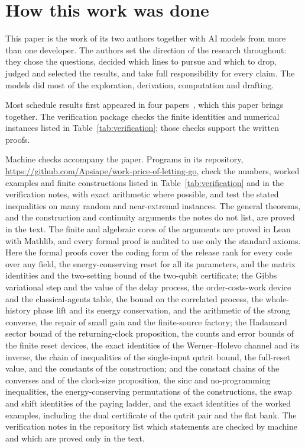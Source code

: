 \section*{How this work was done}
This paper is the work of its two authors together with AI models from more than one developer. The authors set the direction of the research throughout: they chose the questions, decided which lines to pursue and which to drop, judged and selected the results, and take full responsibility for every claim. The models did most of the exploration, derivation, computation and drafting.

Most schedule results first appeared in four papers~\cite{Order,SaveWork,Answering,KeepingTime}, which this paper brings together. The verification package checks the finite identities and numerical instances listed in Table~\ref{tab:verification}; those checks support the written proofs.

Machine checks accompany the paper. Programs in its repository, \url{https://github.com/Apsiape/work-price-of-letting-go}, check the numbers, worked examples and finite constructions listed in Table~\ref{tab:verification} and in the verification notes, with exact arithmetic where possible, and test the stated inequalities on many random and near-extremal instances. The general theorems, and the construction and continuity arguments the notes do not list, are proved in the text. The finite and algebraic cores of the arguments are proved in Lean with Mathlib, and every formal proof is audited to use only the standard axioms. Here the formal proofs cover the coding form of the release rank for every code over any field, the energy-conserving reset for all its parameters, and the matrix identities and the two-setting bound of the two-qubit certificate; the Gibbs variational step and the value of the delay process, the order-costs-work device and the classical-agents table, the bound on the correlated process, the whole-history phase lift and its energy conservation, and the arithmetic of the strong converse, the repair of small gain and the finite-source factory; the Hadamard sector bound of the returning-clock proposition, the counts and error bounds of the finite reset devices, the exact identities of the Werner--Holevo channel and its inverse, the chain of inequalities of the single-input qutrit bound, the full-reset value, and the constants of the construction; and the constant chains of the converses and of the clock-size proposition, the sinc and no-programming inequalities, the energy-conserving permutations of the constructions, the swap and shift identities of the paying ladder, and the exact identities of the worked examples, including the dual certificate of the qutrit pair and the flat bank. The verification notes in the repository list which statements are checked by machine and which are proved only in the text.

